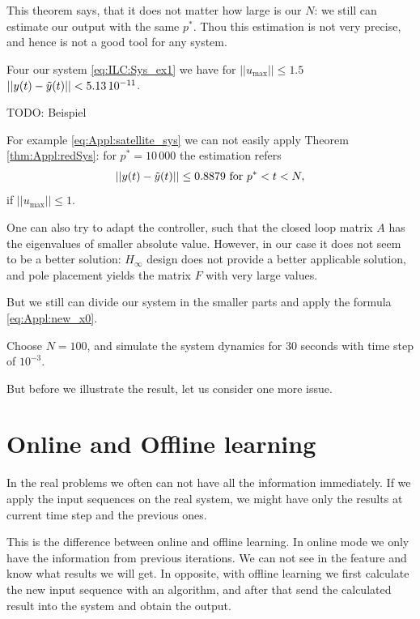 	This theorem says, that it does not matter how large is our $N$: we still can estimate our output with the same $p^*$. 
	Thou this estimation is not very precise, and hence is not a good tool for any system. 
	
	\begin{exam}
		Four our system \eqref{eq:ILC:Sys_ex1} we have for $||u_{\max}||\leq 1.5$ 
		$||y(t) - \tilde{y}(t)|| < 5.13 \, 10^{-11}$. 
		
		TODO: Beispiel 
		
	\end{exam}

\begin{exam}
	\label{ex:Appl:redN}
	For example \eqref{eq:Appl:satellite_sys} we can not easily apply Theorem \ref{thm:Appl:redSys}: for $p^* = 10 \, 000 $ the estimation refers 
	\begin{align}
	||y(t) - \tilde{y}(t)|| \leq 0.8879 \text{ for } p^* < t < N,
	\end{align}
	if $||u_{\max}|| \leq 1$.
	
	One can also try to adapt the controller, such that the closed loop matrix $A$ has the eigenvalues of smaller absolute value. However, in our case it does not seem to be a better solution: $H_\infty$ design does not provide a better applicable solution, and pole placement yields the matrix $F$ with very large values. 
	
	But we still can divide our system in the smaller parts and apply the formula \eqref{eq:Appl:new_x0}. 
	
	Choose $N = 100$, and simulate the system dynamics for 30 seconds with time step of $10^{-3}$. 

But before we illustrate the result, let us consider one more issue. 
	
	
\end{exam}

\section{Online and Offline learning}

In the real problems we often can not have all the information immediately. If we apply the input sequences on the real system, we might have only the results at current time step and the previous ones. 

This is the difference between online and offline learning. In online mode we only have the information from previous iterations. We can not see in the feature and know what results we will get. In opposite, with offline learning we first calculate the new input sequence with an algorithm, and after that send the calculated result into the system and obtain the output. 

